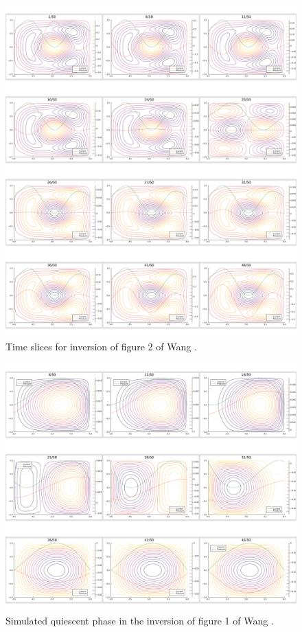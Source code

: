 \begin{figure}[h!]
    \centering
    \includegraphics*[scale=0.24]{imgs/c4/simulated-inversion-fig-2-whole-collage.png}
    \caption{Time slices for inversion of figure 2 of Wang \cite{wang-analytic-solution}.}
    \label{fig-2-inversion-whole}
\end{figure}

\begin{figure}[h!]
    \centering
    \includegraphics*[scale=0.27]{imgs/c4/simulated-inversion-fig-1-quiescent-collage.png}
    \caption{Simulated quiescent phase in the inversion of figure 1 of Wang \cite{wang-analytic-solution}.}
    \label{fig-1-inversion-quiescent}
\end{figure}

